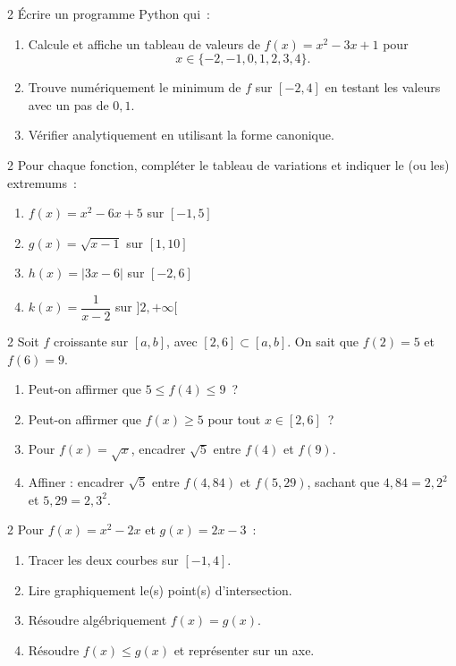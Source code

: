 \begin{exo}{2}
\'Ecrire un programme Python qui~:
\begin{enumerate}
  \item Calcule et affiche un tableau de valeurs de $f(x)=x^2-3x+1$ pour
        \[x\in\{-2,-1,0,1,2,3,4\}.\]
  \item Trouve num\'eriquement le minimum de $f$ sur $[-2,4]$ en testant
        les valeurs avec un pas de $0{,}1$.
  \item V\'erifier analytiquement en utilisant la forme canonique.
\end{enumerate}
\end{exo}

\begin{exo}{2}
Pour chaque fonction, compl\'eter le tableau de variations et indiquer
le (ou les) extremums~:
\begin{enumerate}
  \item $f(x)=x^2-6x+5$ sur $[-1,5]$
  \item $g(x)=\sqrt{x-1}$ sur $[1,10]$
  \item $h(x)=|3x-6|$ sur $[-2,6]$
  \item $k(x)=\dfrac{1}{x-2}$ sur $]2,+\infty[$
\end{enumerate}
\end{exo}

\begin{exo}{2}
Soit $f$ croissante sur $[a,b]$, avec $[2,6]\subset[a,b]$. On sait que $f(2)=5$ et $f(6)=9$.
\begin{enumerate}
  \item Peut-on affirmer que $5 \leq f(4) \leq 9$~?
  \item Peut-on affirmer que $f(x) \geq 5$ pour tout $x\in[2,6]$~?
  \item Pour $f(x)=\sqrt{x}$, encadrer $\sqrt{5}$ entre $f(4)$ et $f(9)$.
  \item Affiner : encadrer $\sqrt5$ entre $f(4{,}84)$ et $f(5{,}29)$,
        sachant que $4{,}84=2{,}2^2$ et $5{,}29=2{,}3^2$.
\end{enumerate}
\end{exo}

\begin{exo}{2}
Pour $f(x)=x^2-2x$ et $g(x)=2x-3$~:
\begin{enumerate}
  \item Tracer les deux courbes sur $[-1,4]$.
  \item Lire graphiquement le(s) point(s) d'intersection.
  \item R\'esoudre alg\'ebriquement $f(x)=g(x)$.
  \item R\'esoudre $f(x)\leq g(x)$ et repr\'esenter sur un axe.
\end{enumerate}
\end{exo}

